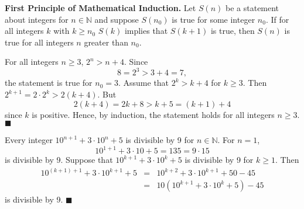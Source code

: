 \medskip

\noindent
{\bf First Principle of Mathematical Induction.} 
Let $S(n)$ be a statement about integers for  $n \in {\mathbb N}$ and suppose $S(n_0)$ is true for some integer $n_0$.  If for all integers $k$ with $k \geq n_0$ $S(k)$ implies that $S(k+1)$ is true, then $S(n)$ is true for all integers $n$ greater than $n_0$.  

\medskip
 
For all integers $n \geq 3$, $2^n > n + 4$. Since
$$
8 = 2^3 > 3 + 4 = 7,
$$
the statement is true for $n_0 = 3$.  Assume that $2^k > k + 4$ for $k \geq 3$.  Then $2^{k + 1} = 2 \cdot 2^{k} > 2(k + 4)$.  But 
$$
2(k + 4) = 2k + 8 > k + 5 = (k + 1) + 4
$$
since $k$ is positive.  Hence, by induction, the statement holds for all integers $n \geq 3$. 
\hspace{\fill} $\blacksquare$

\medskip

Every integer $10^{n + 1} + 3 \cdot 10^n + 5$ is divisible by 9 for $n \in {\mathbb N}$.  For $n = 1$, 
$$
10^{1 + 1} + 3 \cdot 10 + 5 = 135 = 9 \cdot 15
$$
is divisible by 9.  Suppose that $10^{k + 1} + 3 \cdot 10^k + 5$ is divisible by 9 for $k \geq 1$.  Then 
\begin{eqnarray*}
10^{(k + 1) + 1} + 3 \cdot 10^{k + 1} + 5
& = &
10^{k + 2} + 3 \cdot 10^{k + 1} + 50 - 45 \\
& = &
10 (10^{k + 1} + 3 \cdot 10^{k} + 5) - 45
\end{eqnarray*}
is divisible by 9.
\hspace{\fill} $\blacksquare$
 
\medskip

